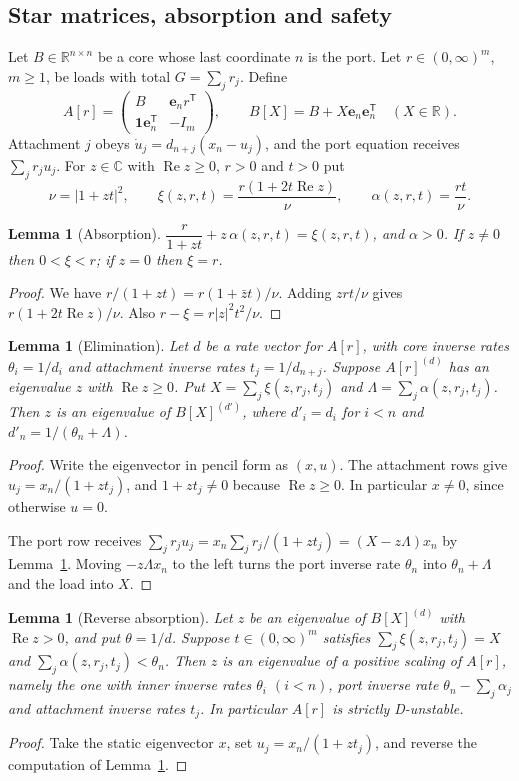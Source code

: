 \documentclass[11pt,a4paper]{article}
\theoremstyle{plain}
\newtheorem{lemma}[theorem]{Lemma}
\theoremstyle{definition}
\theoremstyle{remark}
\newcommand{\R}{\mathbb{R}}
\newcommand{\C}{\mathbb{C}}
\newcommand{\Real}{\operatorname{Re}}
\newcommand{\one}{\mathbf{1}}
\newcommand{\scl}[2]{#1^{(#2)}}
\newcommand{\be}{\mathbf{e}}
\begin{document}
\subsection{Star matrices, absorption and safety}
Let $B\in\R^{n\times n}$ be a core whose last coordinate $n$ is the port. Let
$r\in(0,\infty)^m$, $m\ge1$, be loads with total $G=\sum_jr_j$. Define
\[
A[r]=\begin{pmatrix}B&\be_nr^{\mathsf T}\\ \one \be_n^{\mathsf T}&-I_m\end{pmatrix},\qquad
B[X]=B+X\be_n\be_n^{\mathsf T}\quad(X\in\R).
\]
Attachment $j$ obeys $\dot u_j=d_{n+j}(x_n-u_j)$, and the port equation receives
$\sum_jr_ju_j$. For $z\in\C$ with $\Real z\ge0$, $r>0$ and $t>0$ put
\[
\nu=|1+zt|^2,\qquad \xi(z,r,t)=\frac{r(1+2t\Real z)}{\nu},\qquad \alpha(z,r,t)=\frac{rt}{\nu}.
\]

\begin{lemma}[Absorption]\label{lem:absorb}
$\dfrac{r}{1+zt}+z\,\alpha(z,r,t)=\xi(z,r,t)$, and $\alpha>0$. If $z\ne0$ then
$0<\xi<r$; if $z=0$ then $\xi=r$.
\end{lemma}
\begin{proof}
We have $r/(1+zt)=r(1+\bar zt)/\nu$. Adding $zrt/\nu$ gives $r(1+2t\Real z)/\nu$. Also
$r-\xi=r|z|^2t^2/\nu$.
\end{proof}

\begin{lemma}[Elimination]\label{lem:elim}
Let $d$ be a rate vector for $A[r]$, with core inverse rates $\theta_i=1/d_i$ and
attachment inverse rates $t_j=1/d_{n+j}$. Suppose $\scl{A[r]}d$ has an eigenvalue $z$ with
$\Real z\ge0$. Put $X=\sum_j\xi(z,r_j,t_j)$ and $\Lambda=\sum_j\alpha(z,r_j,t_j)$. Then $z$
is an eigenvalue of $\scl{B[X]}{d'}$, where $d'_i=d_i$ for $i<n$ and
$d'_n=1/(\theta_n+\Lambda)$.
\end{lemma}
\begin{proof}
Write the eigenvector in pencil form as $(x,u)$. The attachment rows give
$u_j=x_n/(1+zt_j)$, and $1+zt_j\ne0$ because $\Real z\ge0$. In particular $x\ne0$,
since otherwise $u=0$.

The port row receives $\sum_jr_ju_j=x_n\sum_jr_j/(1+zt_j)=(X-z\Lambda)x_n$ by
Lemma~\ref{lem:absorb}. Moving $-z\Lambda x_n$ to the left turns the port inverse rate
$\theta_n$ into $\theta_n+\Lambda$ and the load into $X$.
\end{proof}

\begin{lemma}[Reverse absorption]\label{lem:reverse}
Let $z$ be an eigenvalue of $\scl{B[X]}d$ with $\Real z>0$, and put $\theta=1/d$. Suppose
$t\in(0,\infty)^m$ satisfies $\sum_j\xi(z,r_j,t_j)=X$ and $\sum_j\alpha(z,r_j,t_j)<\theta_n$.
Then $z$ is an eigenvalue of a positive scaling of $A[r]$, namely the one with inner
inverse rates $\theta_i$ $(i<n)$, port inverse rate $\theta_n-\sum_j\alpha_j$ and attachment
inverse rates $t_j$. In particular $A[r]$ is strictly D-unstable.
\end{lemma}
\begin{proof}
Take the static eigenvector $x$, set $u_j=x_n/(1+zt_j)$, and reverse the computation of
Lemma~\ref{lem:elim}.
\end{proof}
\end{document}
